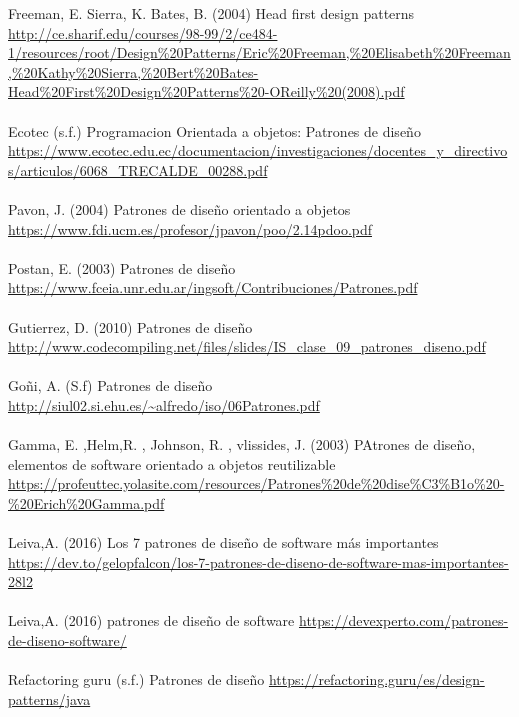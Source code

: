 \documentclass[twoside,twocolumn]{article}
\begin{document}
\begin{thebibliography}{99} %
Freeman, E. Sierra, K. Bates, B. (2004) Head first design patterns
\url{http://ce.sharif.edu/courses/98-99/2/ce484-1/resources/root/Design%20Patterns/Eric%20Freeman,%20Elisabeth%20Freeman,%20Kathy%20Sierra,%20Bert%20Bates-Head%20First%20Design%20Patterns%20-OReilly%20(2008).pdf} 
\\ \\ Ecotec (s.f.) Programacion Orientada a objetos: Patrones de diseño
\url{https://www.ecotec.edu.ec/documentacion/investigaciones/docentes_y_directivos/articulos/6068_TRECALDE_00288.pdf} \\ \\ 
Pavon, J. (2004) Patrones de diseño orientado a objetos
\url{https://www.fdi.ucm.es/profesor/jpavon/poo/2.14pdoo.pdf}
\\ \\ 
Postan, E. (2003) Patrones de diseño
\url{https://www.fceia.unr.edu.ar/ingsoft/Contribuciones/Patrones.pdf}
\\ \\
Gutierrez, D. (2010) Patrones de diseño
\url{http://www.codecompiling.net/files/slides/IS_clase_09_patrones_diseno.pdf}
\\ \\ 
Goñi, A. (S.f) Patrones de diseño
\url{http://siul02.si.ehu.es/~alfredo/iso/06Patrones.pdf}
\\ \\ 
Gamma, E. ,Helm,R. , Johnson, R. , vlissides, J. (2003) PAtrones de diseño, elementos de software orientado a objetos reutilizable
\url{https://profeuttec.yolasite.com/resources/Patrones%20de%20dise%C3%B1o%20-%20Erich%20Gamma.pdf}
\\ \\ 
Leiva,A. (2016) Los 7 patrones de diseño de software más importantes
\url{https://dev.to/gelopfalcon/los-7-patrones-de-diseno-de-software-mas-importantes-28l2}
\\ \\ 
Leiva,A. (2016) patrones de diseño de software
\url{https://devexperto.com/patrones-de-diseno-software/}
\\ \\ 
Refactoring guru (s.f.) Patrones de diseño
\url{https://refactoring.guru/es/design-patterns/java}
 \\ \\ 
 
\end{thebibliography}

\end{document}
